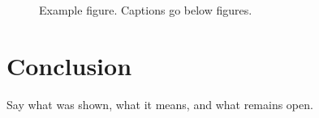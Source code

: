 \documentclass[11pt,a4paper]{article}
\begin{document}
\begin{figure}[htbp]
  \centering
  \caption{Example figure. Captions go below figures.}
  \label{fig:example}
\end{figure}

\section{Conclusion}

Say what was shown, what it means, and what remains open.



\end{document}
